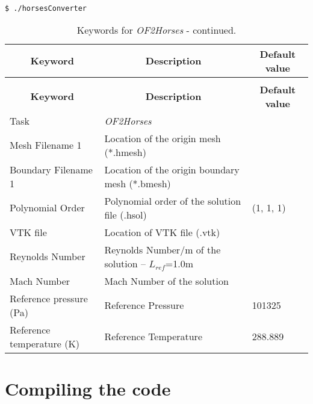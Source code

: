 \documentclass[a4paper,10pt]{report}
\begin{document}
\begin{lstlisting}[language=bash]
	$ ./horsesConverter
\end{lstlisting}


\begin{longtable}{|p{5cm}|p{9cm}|p{2.2cm}|}
\caption{Keywords for \textit{OF2Horses}.} \label{tab:OF2Horses} \\
\hline
\multicolumn{1}{|c|}{\textbf{Keyword}} & \multicolumn{1}{c|}{\textbf{Description}} & \multicolumn{1}{c|}{\textbf{Default value}} \\ \hline
\endfirsthead

\caption{Keywords for \textit{OF2Horses} - continued.} \\
\hline
\multicolumn{1}{|c|}{\textbf{Keyword}} & \multicolumn{1}{c|}{\textbf{Description}} & \multicolumn{1}{c|}{\textbf{Default value}} \\ \hline
\endhead

Task 	        		& \textit{OF2Horses} 						&  \\ \hline
Mesh Filename 1 		& Location of the origin mesh (*.hmesh) 	&  \\ \hline
Boundary Filename 1 	& Location of the origin boundary mesh (*.bmesh) 	&  \\ \hline
Polynomial Order 	& Polynomial order of the solution file (.hsol)  & (1, 1, 1) \\ \hline
VTK file         	& Location of VTK file (.vtk)   &             \\ \hline
Reynolds Number    	& Reynolds Number/m of the solution -- $L_{ref}$=1.0m   &             \\ \hline
Mach Number         	& Mach Number of the solution      &             \\ \hline
Reference pressure (Pa)         	& Reference Pressure   & 101325             \\ \hline
Reference temperature (K)        & Reference Temperature   & 288.889             \\ \hline

\end{longtable}


\chapter{Compiling the code}
\end{document}
